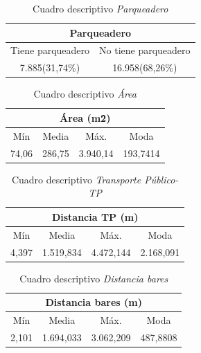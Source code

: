 \documentclass[conference, 10pt]{IEEEtran}
\begin{document}
\begin{table}[htbp]
\caption{Cuadro descriptivo \textit{Parqueadero}}
\begin{center}
\begin{tabular}{|c|c|}
\hline
\multicolumn{2}{|c|}{\textbf{Parqueadero}} \\
\cline{1-2} 
\hline
 Tiene parqueadero&No tiene parqueadero\\
 7.885(31,74\%)&16.958(68,26\%)\\
  
	\hline
\end{tabular}
\label{tab_6}
\end{center}
\end{table}

\begin{table}[htbp]
\caption{Cuadro descriptivo \textit{Área}}
\begin{center}
\begin{tabular}{|c|c|c|c|}
\hline
\multicolumn{4}{|c|}{\textbf{Área (m\^{2})}} \\
\cline{1-4} 
\hline
 Mín&Media&Máx.&Moda\\
\hline
 74,06&286,75&3.940,14&193,7414\\
 	\hline
\end{tabular}
\label{tab_7}
\end{center}
\end{table}


\begin{table}[htbp]
\caption{Cuadro descriptivo \textit{Transporte Público-TP}}
\begin{center}
\begin{tabular}{|c|c|c|c|}
\hline
\multicolumn{4}{|c|}{\textbf{Distancia TP (m)}} \\
\cline{1-4} 
\hline
 Mín&Media&Máx.&Moda\\
\hline
 4,397&1.519,834&4.472,144&2.168,091\\
 	\hline
\end{tabular}
\label{tab_8}
\end{center}
\end{table}

\begin{table}[htbp]
\caption{Cuadro descriptivo \textit{Distancia bares}}
\begin{center}
\begin{tabular}{|c|c|c|c|}
\hline
\multicolumn{4}{|c|}{\textbf{Distancia bares (m)}} \\
\cline{1-4} 
\hline
 Mín&Media&Máx.&Moda\\
\hline
 2,101&1.694,033&3.062,209&487,8808\\
 	\hline
\end{tabular}
\label{tab_9}
\end{center}
\end{table}
\end{document}
